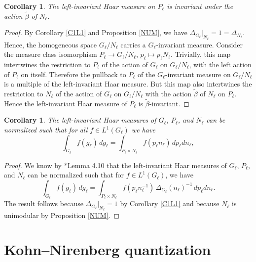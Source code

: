 \documentclass[a4paper,11pt,reqno]{amsart}
\numberwithin{equation}{section}
\newtheorem{corollary}[theorem]{Corollary}
\theoremstyle{remark}
\theoremstyle{definition}
\begin{document}
\begin{corollary}
\label{C1P1}
The left-invariant Haar measure on $P_\ell$ is invariant under the action $\tilde\beta$ of $N_\ell$.
\end{corollary}
\begin{proof}
By Corollary  \ref{C1L1} and Proposition \ref{NUM}, we have $\Delta_{G_\ell}\big|_{N_\ell}=1 = \Delta_{N_\ell}$. Hence, the homogeneous space $G_\ell/N_\ell$ carries
a $G_\ell$-invariant measure. Consider the measure class isomorphism $P_\ell\to G_\ell/N_\ell$, $p_\ell\mapsto p_\ell N_\ell$. Trivially, this map
intertwines the restriction to $P_\ell$ of the action of $G_\ell$ on $G_\ell/N_\ell$, with the left action of $P_\ell$ on itself.
Therefore the pullback to  $P_\ell$ of the $G_\ell$-invariant measure on $G_\ell/N_\ell$ is a multiple of the left-invariant Haar measure.
But this map also
intertwines the restriction to $N_\ell$ of the  action of $G_\ell$ on $G_\ell/N_\ell$ with the action $\tilde\beta$ of $N_\ell$ on $P_\ell$.
Hence the left-invariant Haar measure of $P_\ell$ is $\tilde\beta$-invariant.
\end{proof}

\begin{corollary}
\label{C2P1}
The left-invariant Haar measures of $G_\ell$, $P_\ell$, and $N_\ell$ can be normalized such that for all $f\in L^1(G_\ell)$ we have
$$
\int_{G_\ell} f(g_\ell)\,dg_\ell=\int_{P_\ell\times N_\ell} f( p_\ell n_\ell)\,d p_\ell dn_\ell,
$$
\end{corollary}
\begin{proof}
We know  by  \cite{VV}*{Lemma 4.10} that the left-invariant Haar measures of $G_\ell$, $P_\ell$, and $N_\ell$ can be normalized such that for $ f\in L^1(G_\ell)$, we have
$$
\int_{G_\ell} f(g_\ell)\,dg_\ell=\int_{P_\ell\times N_\ell} f( p_\ell n_\ell^{-1})\,\Delta_{G_\ell}(n_\ell)^{-1}\,d p_\ell dn_\ell.
$$
The result follows because $\Delta_{G_\ell}\big|_{N_\ell}=1$  by Corollary  \ref{C1L1}  and because $N_\ell$ is unimodular by Proposition \ref{NUM}.
\end{proof}

 \section{Kohn--Nirenberg quantization}
\end{document}
